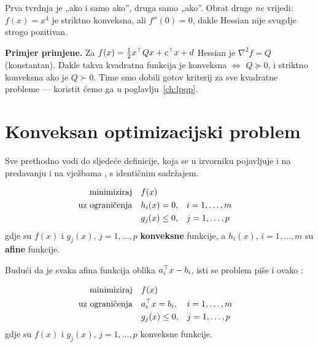 \begin{napomena}
Prva tvrdnja je „ako i samo ako”, druga samo „ako”. Obrat druge \emph{ne}
vrijedi: $f(x) = x^4$ je striktno konveksna, ali $f''(0) = 0$, dakle Hessian
nije svugdje strogo pozitivan.
\end{napomena}

\textbf{Primjer primjene.} Za $f(x) = \tfrac12 x\T Q x + c\T x + d$ Hessian je
$\nabla^2 f = Q$ (konstantan). Dakle takva kvadratna funkcija je konveksna
$\Leftrightarrow$ $Q \succeq 0$, i striktno konveksna ako je $Q \succ 0$. Time
smo dobili gotov kriterij za sve kvadratne probleme --- koristit ćemo ga u
poglavlju~\ref{ch:lpqp}.

\section{Konveksan optimizacijski problem}
\label{sec:konveksni-problem}

Sve prethodno vodi do sljedeće definicije, koja se u izvorniku pojavljuje i na
predavanju  i na vježbama , s identičnim sadržajem.

\begin{definicija}
\begin{equation}
\begin{aligned}
\minim & f(x) \\
\uzogr & h_i(x) = 0, && i = 1,\dots,m \\
       & g_j(x) \le 0, && j = 1,\dots,p
\end{aligned}
\end{equation}
gdje su $f(x)$ i $g_j(x)$, $j = 1,\dots,p$ \textbf{konveksne} funkcije, a
$h_i(x)$, $i = 1,\dots,m$ su \textbf{afine} funkcije.
\end{definicija}

Budući da je svaka afina funkcija oblika $a_i\T x - b_i$, isti se problem piše i
ovako :

\begin{definicija}
\begin{equation}
\begin{aligned}
\minim & f(x) \\
\uzogr & a_i\T x = b_i, && i = 1,\dots,m \\
       & g_j(x) \le 0, && j = 1,\dots,p
\end{aligned}
\end{equation}
gdje su $f(x)$ i $g_j(x)$, $j = 1,\dots,p$ konveksne funkcije.
\end{definicija}


